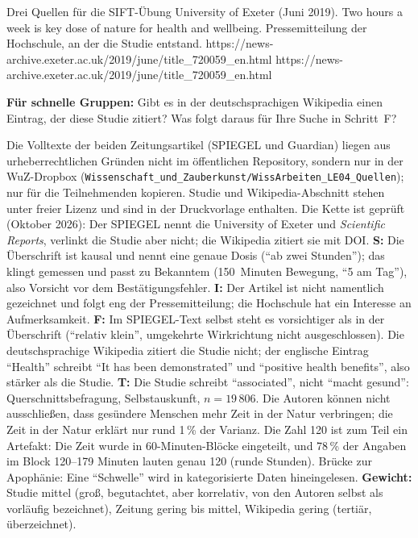 \begin{uebungsblattc}{Drei Quellen für die SIFT-Übung}
{University of Exeter (Juni 2019). Two hours a week is key dose of nature
for health and wellbeing. Pressemitteilung der Hochschule, an der die
Studie entstand.}
{https://news-archive.exeter.ac.uk/2019/june/title_720059_en.html}
{https://news-archive.exeter.ac.uk/2019/june/title_720059_en.html}

\textbf{Für schnelle Gruppen:} Gibt es in der deutschsprachigen Wikipedia
einen Eintrag, der diese Studie zitiert? Was folgt daraus für Ihre Suche
in Schritt~F?

\LEvierVolltexte

\begin{lehrhinweis}
Die Volltexte der beiden Zeitungsartikel (SPIEGEL und Guardian) liegen
aus urheberrechtlichen Gründen nicht im öffentlichen Repository, sondern
nur in der WuZ-Dropbox (\texttt{Wissenschaft\_und\_Zauberkunst/WissArbeiten\_LE04\_Quellen});
nur für die Teilnehmenden kopieren. Studie und Wikipedia-Abschnitt
stehen unter freier Lizenz und sind in der Druckvorlage enthalten.
Die Kette ist geprüft (Oktober 2026): Der SPIEGEL nennt die University of
Exeter und \emph{Scientific Reports}, verlinkt die Studie aber nicht; die
Wikipedia zitiert sie mit DOI. \textbf{S:} Die Überschrift ist kausal und
nennt eine genaue Dosis (\enquote{ab zwei Stunden}); das klingt gemessen
und passt zu Bekanntem (150~Minuten Bewegung, \enquote{5 am Tag}), also
Vorsicht vor dem Bestätigungsfehler. \textbf{I:} Der Artikel ist nicht
namentlich gezeichnet und folgt eng der Pressemitteilung; die Hochschule
hat ein Interesse an Aufmerksamkeit. \textbf{F:} Im SPIEGEL-Text selbst
steht es vorsichtiger als in der Überschrift (\enquote{relativ klein},
umgekehrte Wirkrichtung nicht ausgeschlossen). Die deutschsprachige
Wikipedia zitiert die Studie nicht; der englische Eintrag
\enquote{Health} schreibt \enquote{It has been demonstrated} und
\enquote{positive health benefits}, also stärker als die Studie.
\textbf{T:} Die Studie schreibt \enquote{associated}, nicht
\enquote{macht gesund}: Querschnittsbefragung, Selbstauskunft,
$n = 19\,806$. Die Autoren können nicht ausschließen, dass gesündere
Menschen mehr Zeit in der Natur verbringen; die Zeit in der Natur erklärt
nur rund 1\,\% der Varianz. Die Zahl 120 ist zum Teil ein Artefakt: Die
Zeit wurde in 60-Minuten-Blöcke eingeteilt, und 78\,\% der Angaben im
Block 120--179 Minuten lauten genau 120 (runde Stunden). Brücke zur
Apophänie: Eine \enquote{Schwelle} wird in kategorisierte Daten
hineingelesen. \textbf{Gewicht:} Studie mittel (groß, begutachtet, aber
korrelativ, von den Autoren selbst als vorläufig bezeichnet), Zeitung
gering bis mittel, Wikipedia gering (tertiär, überzeichnet).
\end{lehrhinweis}
\end{uebungsblattc}
